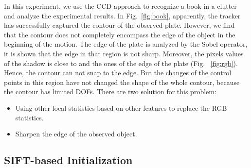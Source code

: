 \documentclass[conference]{IEEEtran}
\begin{document}
In this experiment, we use the CCD approach to recognize a book
in a clutter and analyze the experimental results. 
In Fig.~\ref{fig:book}, apparently, the tracker has successfully
captured the contour of the observed plate. However, we find that the
contour does not completely encompass the edge of the object in the
beginning of the motion. The edge of the plate is analyzed by the
Sobel operator, it is shown that the edge in that region is not
sharp. Moreover, the pixels values of the shadow is
close to and the ones of the edge of the plate (Fig. ~\ref{fig:rgb}). Hence,
the contour can not snap to the edge. But the changes of the control
points in this region have not changed the shape of the whole
contour, because the contour has limited DOFs. There are two solution
for this problem:
\begin{itemize}
\item Using other local statistics based on other features to replace
  the RGB statistics.
\item Sharpen the edge of the observed object.
\end{itemize}
\subsection{SIFT-based Initialization}
\label{sec:sift_init}
\end{document}
